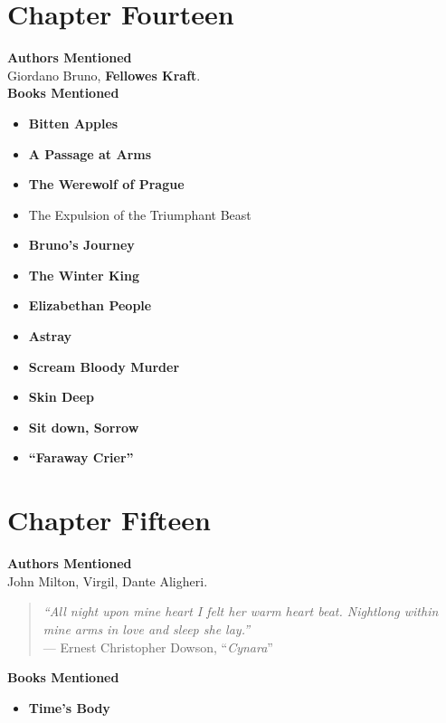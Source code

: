 \documentclass[12pt,makeidx]{extreport}
\begin{document}
\section{Chapter Fourteen}
\textbf{Authors Mentioned}\\
Giordano Bruno, \textbf{Fellowes Kraft}.
\\

\hspace{-1.5em}\textbf{Books Mentioned}
\begin{itemize}
\item \textbf{Bitten Apples} \parencite{Craft}
\item \textbf{A Passage at Arms} \parencite{Crafta}
\item \textbf{The Werewolf of Prague} \parencite{CraftW1}
\item The Expulsion of the Triumphant Beast \parencite{Bruno1964}
\item \textbf{Bruno’s Journey} \parencite{Craft1931}
\item \textbf{The Winter King} \parencite{Craft1941}
\item \textbf{Elizabethan People} \parencite{Craft1953}
\item \textbf{Astray} \parencite{Craft1959}
\item \textbf{Scream Bloody Murder} \parencite{Craft1939}
\item \textbf{Skin Deep} \parencite{Craftb}
\item \textbf{Sit down, Sorrow} \parencite{Craft1960}
\item \textbf{``Faraway Crier''} \parencite{faraway}
\end{itemize}


\section{Chapter Fifteen}
\textbf{Authors Mentioned}\\
John Milton, Virgil, Dante Aligheri.
\\
\begin{quote}
\textit{``All night upon mine heart I felt her warm heart beat. Nightlong within mine arms in love and sleep she lay.''}\\
--- Ernest Christopher Dowson, ``\textit{Cynara}''
\end{quote}

\hspace{-1.5em}\textbf{Books Mentioned}
\begin{itemize}
\item \textbf{Time's Body} \parencite{Barr}
\end{itemize}
\end{document}
